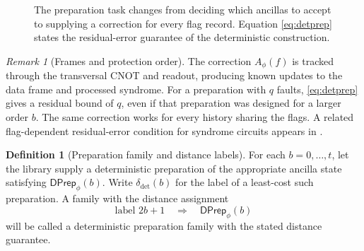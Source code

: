 \documentclass[11pt,a4paper]{article}
\theoremstyle{definition}
\newtheorem{definition}[theorem]{Definition}
\theoremstyle{remark}
\newtheorem{remark}[theorem]{Remark}
\newcommand{\DPrep}{\mathsf{DPrep}}
\begin{document}
\begin{figure}[H]
\centering
{}
\caption{The preparation task changes from deciding which ancillas to
accept to supplying a correction for every flag record. Equation
\eqref{eq:detprep} states the residual-error guarantee of the deterministic
construction.}
\label{fig:detprep}
\end{figure}

\begin{remark}[Frames and protection order]
The correction $A_\phi(f)$ is tracked through the transversal CNOT and
readout, producing known updates to the data frame and processed syndrome.
For a preparation with $q$ faults, \eqref{eq:detprep} gives a residual
bound of $q$, even if that preparation was designed for a larger order $b$.
The same correction works for every history sharing the flags. A related
flag-dependent residual-error condition for syndrome circuits appears in
\cite[Definition~2]{chao}.
\end{remark}

\begin{definition}[Preparation family and distance labels]
For each $b=0,\ldots,t$, let the library supply a deterministic preparation
of the appropriate ancilla state satisfying $\DPrep_\phi(b)$.
Write $\delta_{\mathrm{det}}(b)$ for the label of a least-cost such
preparation. A family with the distance assignment
\begin{equation}
 \text{label }2b+1\quad\Longrightarrow\quad\DPrep_\phi(b)
 \label{eq:distancecontract}
\end{equation}
will be called a deterministic preparation family with the stated distance
guarantee.
\end{definition}
\end{document}

